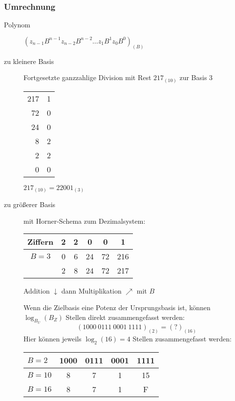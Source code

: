 \documentclass[12pt,a4paper]{article}
\begin{document}
	\subsubsection{Umrechnung}
		\begin{description}
			\item[Polynom] $(z_{n-1}B^{n-1}z_{n-2}B^{n-2} \dots z_1B^{1}z_0B^{0})_{(B)}$
			\item[zu kleinere Basis] Fortgesetzte ganzzahlige Division mit Rest
				$217_{(10)}$ zur Basis 3 \\
				\begin{tabular}{r c}
					217 & 1 \\
					72 & 0 \\
					24 & 0 \\
					8 & 2 \\
					2 & 2 \\
					0 & 0
				\end{tabular} $217_{(10)} = 22001_{(3)}$
			\item[zu größerer Basis] mit Horner-Schema zum Dezimalsystem:
			
				\begin{tabular}{|c||c|c|c|c|c|} \hline
					Ziffern & 2 & 2 & 0 & 0 & 1 \\ \hline \hline
					$B=3$ & 0 & 6 & 24 & 72 & 216 \\ \hline
					& 2 & 8 & 24 & 72 & 217 \\ \hline
				\end{tabular} Addition $\downarrow$ dann Multiplikation $\nearrow$ mit $B$
				
				Wenn die Zielbasis eine Potenz der Ursprungsbasis ist, können $\log_{B_U}(B_Z)$ Stellen direkt zusammengefasst werden:
				$$(1000\ 0111\ 0001\ 1111)_{(2)}=(?)_{(16)}$$
				Hier können jeweils $\log_2(16)=4$ Stellen zusammengefasst werden:
				
				\begin{tabular}[t]{|l||c|c|c|c|} \hline
					$B = 2$ & 1000 & 0111 & 0001 & 1111 \\ \hline
					$B = 10$ & 8 & 7 & 1 & 15 \\ \hline
					$B = 16$ & 8 & 7 & 1 & F \\ \hline
				\end{tabular}		
		\end{description}
\end{document}
